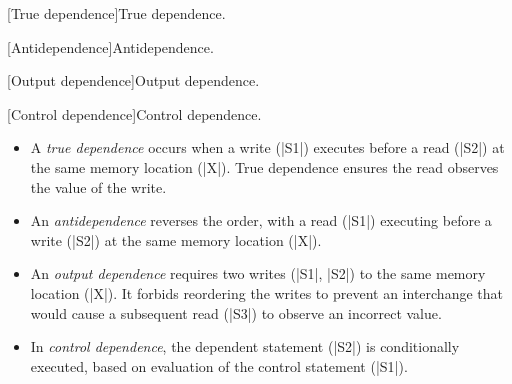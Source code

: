 \begin{center}
\begin{minipage}[t]{.4\textwidth}
\captionsetup{type=lstlisting}
[True dependence]{True dependence.}
\label{dep-true}
\end{minipage}\hspace{3em}
\begin{minipage}[t]{.4\textwidth}
\captionsetup{type=lstlisting}
[Antidependence]{Antidependence.}
\label{dep-anti}
\end{minipage}

\begin{minipage}[t]{.4\textwidth}
\captionsetup{type=lstlisting}
[Output dependence]{Output dependence.}
\label{dep-out}
\end{minipage}\hspace{3em}
\begin{minipage}[t]{.4\textwidth}
\captionsetup{type=lstlisting}
[Control dependence]{Control dependence.}
\label{dep-control}
\end{minipage}
\end{center}

\begin{itemize}
\item A \emph{true dependence}
occurs when a write (\pr|S1|) executes before a read (\pr|S2|) at the same memory location (\pr|X|).
True dependence ensures the read observes the value of the write.

\item An \emph{antidependence}
reverses the order,
with a read (\pr|S1|) executing before a write (\pr|S2|) at the same memory location (\pr|X|).

\item An \emph{output dependence}
requires two writes  (\pr|S1|, \pr|S2|) to the same memory location (\pr|X|).
It forbids reordering the writes to prevent an interchange that would cause a subsequent read (\pr|S3|) to observe an incorrect value.

\item In \emph{control dependence}, the dependent statement (\pr|S2|) is conditionally executed,
based on evaluation of the control statement (\pr|S1|).
\end{itemize}


